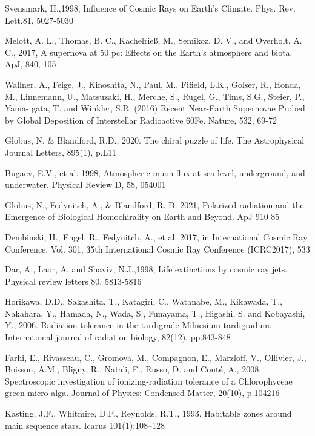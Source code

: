 \documentclass[a4paper,11pt]{article}
\begin{document}
\begin{thebibliography}{99}
Svensmark, H.,1998,  Influence of Cosmic Rays on Earth’s Climate. Phys. Rev. Lett.81, 5027-5030

Melott, A. L., Thomas, B. C., Kachelrieß, M., Semikoz, D. V., and Overholt, A. C., 2017, A supernova at 50 pc: Effects on the Earth's atmosphere and biota. ApJ, 840, 105

 Wallner, A., Feige, J., Kinoshita, N., Paul, M., Fifield, L.K., Golser, R., Honda, M., Linnemann, U., Matsuzaki, H., Merche, S., Rugel, G., Tims, S.G., Steier, P., Yama- gata, T. and Winkler, S.R. (2016) Recent Near-Earth Supernovae Probed by Global Deposition of Interstellar Radioactive 60Fe. Nature, 532, 69-72

 Globus, N. \& Blandford, R.D., 2020. The chiral puzzle of life. The Astrophysical Journal Letters, 895(1), p.L11

 Bugaev, E.V., et al. 1998, Atmospheric muon flux at sea level, underground, and underwater. Physical Review D, 58, 054001

Globus, N., Fedynitch, A., \& Blandford, R. D. 2021, Polarized radiation and the Emergence of Biological Homochirality on Earth and Beyond. ApJ 910 85

 Dembinski, H., Engel, R., Fedynitch, A., et al. 2017, in International Cosmic Ray Conference, Vol. 301, 35th International Cosmic Ray Conference (ICRC2017), 533






 	Dar, A., Laor, A. and Shaviv, N.J.,1998, Life extinctions by cosmic ray jets. Physical review letters 80, 5813-5816

  Horikawa, D.D., Sakashita, T., Katagiri, C., Watanabe, M., Kikawada, T., Nakahara, Y., Hamada, N., Wada, S., Funayama, T., Higashi, S. and Kobayashi, Y., 2006. Radiation tolerance in the tardigrade Milnesium tardigradum. International journal of radiation biology, 82(12), pp.843-848

 Farhi, E., Rivasseau, C., Gromova, M., Compagnon, E., Marzloff, V., Ollivier, J., Boisson, A.M., Bligny, R., Natali, F., Russo, D. and Couté, A., 2008. Spectroscopic investigation of ionizing-radiation tolerance of a Chlorophyceae green micro-alga. Journal of Physics: Condensed Matter, 20(10), p.104216

Kasting, J.F., Whitmire, D.P., Reynolds, R.T., 1993, Habitable zones around main sequence stars. Icarus 101(1):108–128



\end{thebibliography}
\end{document}
